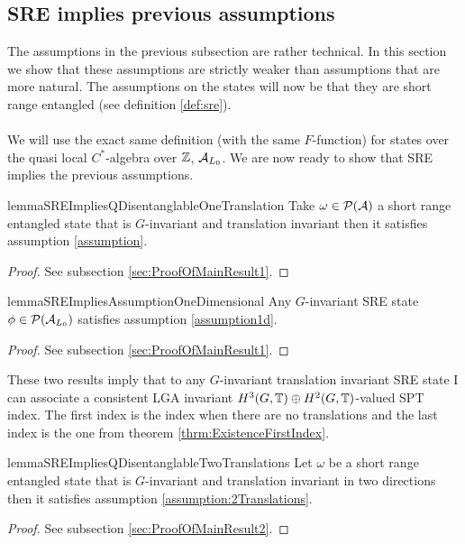 \documentclass[11pt,a4paper,twoside]{article}
\numberwithin{equation}{section}
\begin{document}
\subsection{SRE implies previous assumptions}\label{sec:Results_1}
The assumptions in the previous subsection are rather technical. In this section we show that these assumptions are strictly weaker than assumptions that are more natural. The assumptions on the states will now be that they are short range entangled (see definition \ref{def:sre}).\\\\
We will use the exact same definition (with the same $F$-function) for states over the quasi local $C^*$-algebra over $\ZZ$, $\AA_{L_0}$. We are now ready to show that SRE implies the previous assumptions.
\begin{restatable}{lemma}{SREImpliesQDisentanglableOneTranslation}\label{lem:SRE_Implies_QDisentanglable_OneTranslation}
	Take $\omega\in\PP(\AA)$ a short range entangled state that is $G$-invariant and translation invariant then it satisfies assumption \ref{assumption}.
\end{restatable}
\begin{proof}
	See subsection \ref{sec:ProofOfMainResult1}.
\end{proof}
\begin{restatable}{lemma}{SREImpliesAssumptionOneDimensional}\label{lem:SRE_Implies_Assumption_1d}
	Any $G$-invariant SRE state $\phi\in\PP(\AA_{L_0})$ satisfies assumption \ref{assumption1d}.
\end{restatable}
\begin{proof}
	See subsection \ref{sec:ProofOfMainResult1}.
\end{proof}
These two results imply that to any $G$-invariant translation invariant SRE state I can associate a consistent LGA invariant $H^3(G,\TT)\oplus H^2(G,\TT)$-valued SPT index. The first index is the index when there are no translations and the last index is the one from theorem \ref{thrm:ExistenceFirstIndex}.
\begin{restatable}{lemma}{SREImpliesQDisentanglableTwoTranslations}\label{lem:SRE_Implies_QDisentanglable_TwoTranslations}
	Let $\omega$ be a short range entangled state that is $G$-invariant and translation invariant in two directions then it satisfies assumption \ref{assumption:2Translations}.
\end{restatable}
\begin{proof}
	See subsection \ref{sec:ProofOfMainResult2}.
\end{proof}
\end{document}
